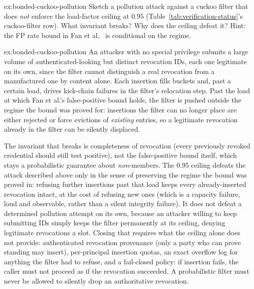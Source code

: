 \documentclass[11pt,a4paper]{article}
\theoremstyle{definition}
\theoremstyle{remark}
\begin{document}
\begin{pdexercise}[kind=Trace,rating=2]{ex:bonded-cuckoo-pollution}
Sketch a pollution attack against a cuckoo filter that does \emph{not} enforce the load-factor ceiling at $0.95$ (Table~\ref{tab:verification-status}'s cuckoo-filter row). What invariant breaks? Why does the ceiling defeat it? Hint: the FP rate bound in Fan et al.~ is conditional on the regime.
\end{pdexercise}
\begin{pdsolution}{ex:bonded-cuckoo-pollution}
An attacker with no special privilege submits a large volume of authenticated-looking but distinct revocation IDs, each one legitimate on its own, since the filter cannot distinguish a real revocation from a manufactured one by content alone. Each insertion fills buckets and, past a certain load, drives kick-chain failures in the filter's relocation step. Past the load at which Fan et al.'s false-positive bound holds, the filter is pushed outside the regime the bound was proved for: insertions the filter can no longer place are either rejected or force evictions of \emph{existing} entries, so a legitimate revocation already in the filter can be silently displaced.

The invariant that breaks is completeness of revocation (every previously revoked credential should still test positive), not the false-positive bound itself, which stays a probabilistic guarantee about \emph{non}-members. The $0.95$ ceiling defeats the attack described above only in the sense of preserving the regime the bound was proved in: refusing further insertions past that load keeps every already-inserted revocation intact, at the cost of refusing new ones (which is a capacity failure, loud and observable, rather than a silent integrity failure). It does not defeat a determined pollution attempt on its own, because an attacker willing to keep submitting IDs simply keeps the filter permanently at its ceiling, denying legitimate revocations a slot. Closing that requires what the ceiling alone does not provide: authenticated revocation provenance (only a party who can prove standing may insert), per-principal insertion quotas, an exact overflow log for anything the filter had to refuse, and a fail-closed policy: if insertion fails, the caller must not proceed as if the revocation succeeded. A probabilistic filter must never be allowed to silently drop an authoritative revocation.
\end{pdsolution}

\end{document}
